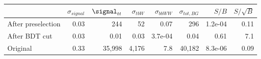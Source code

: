 \begin{tabular}{lrrrrrrr}
\toprule
{} &  $\sigma_{signal}$ &  $\signal_{tt}$ &  $\sigma_{tbW}$ &  $\sigma_{bbWW}$ &  $\sigma_{tot,BG}$ &   $S/B$ &  $S/\sqrt{B}$ \\
\midrule
After preselection &               0.03 &             244 &              52 &             0.07 &                296 & 1.2e-04 &          0.11 \\
After BDT cut      &               0.03 &            0.01 &            0.03 &          3.7e-04 &               0.04 &    0.61 &           7.1 \\
Original           &               0.33 &          35,998 &           4,176 &              7.8 &             40,182 & 8.3e-06 &          0.09 \\
\bottomrule
\end{tabular}
